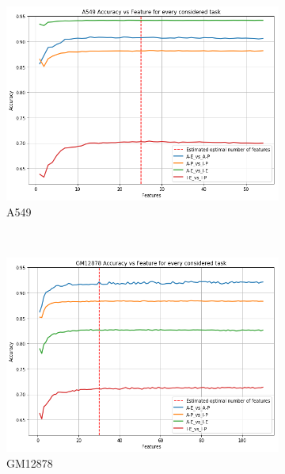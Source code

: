 \begin{figure}[!htb]
    \centering
    \begin{subfigure}[b]{0.48\textwidth}
        \includegraphics[width=\textwidth]{images/features_plots_accuracy/A549_n_features.png}
        \caption{A549}
        \label{fig:A549_n_feat}
    \end{subfigure}
    ~ 
    \begin{subfigure}[b]{0.48\textwidth}
        \includegraphics[width=\textwidth]{images/features_plots_accuracy/GM12878_n_features.png}
        \caption{GM12878}
        \label{fig:GM12878_n_feat}
    \end{subfigure}
    ~ 
    \begin{subfigure}[b]{0.48\textwidth}

\end{subfigure}
\end{figure}
